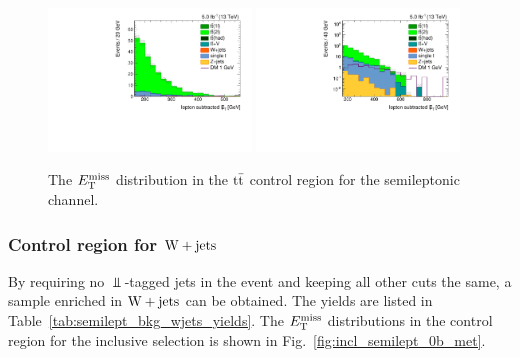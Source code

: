\begin{figure}[htbp]
  \centering
  \includegraphics[width=0.48\textwidth]{figures/semilept-incl-2l-fmet_l.pdf}
  \includegraphics[width=0.48\textwidth]{figures/semilept-incl-2l-fmetlog_l.pdf}
  \caption{The $E_\mathrm{T}^{\mathrm{miss}}$ distribution in the $\mathrm{t}\bar{\mathrm{t}}$ control region for the semileptonic channel.}
  \label{fig:incl_semilept_2l_fmet}
\end{figure}

\subsubsection{Control region for \texorpdfstring{$\mathrm{W+jets}$}{Wjets}}
\label{subsubsec:bkg_semilept_wjets}

By requiring no $\Bot$-tagged jets in the event and keeping all other cuts the same, a sample enriched in $\mathrm{W+jets}$  can be obtained. The yields are listed in Table~\ref{tab:semilept_bkg_wjets_yields}. The $E_\mathrm{T}^{\mathrm{miss}}$ distributions in the control region for the inclusive selection is shown in Fig.~\ref{fig:incl_semilept_0b_met}.

